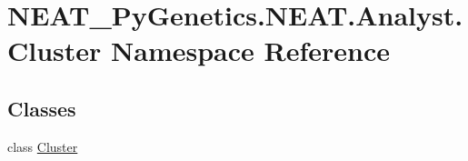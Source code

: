 \hypertarget{namespaceNEAT__PyGenetics_1_1NEAT_1_1Analyst_1_1Cluster}{}\section{N\+E\+A\+T\+\_\+\+Py\+Genetics.\+N\+E\+A\+T.\+Analyst.\+Cluster Namespace Reference}
\label{namespaceNEAT__PyGenetics_1_1NEAT_1_1Analyst_1_1Cluster}
\subsection*{Classes}
\begin{DoxyCompactItemize}
\item 
class \hyperlink{classNEAT__PyGenetics_1_1NEAT_1_1Analyst_1_1Cluster_1_1Cluster}{Cluster}
\end{DoxyCompactItemize}

